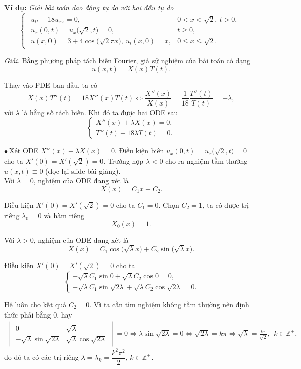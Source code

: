 \documentclass[10pt, a4paper]{article}
\begin{document}
	\textbf{Ví dụ:} \textit{Giải bài toán dao động tự do với hai đầu tự do} $$\begin{cases}
		\begin{array}{ll}
			u_{tt}-18u_{xx}=0, & 0<x<\sqrt2,~t>0,\\
			u_x(0,t)=u_x\big(\sqrt2,t\big)=0, & t\ge0,\\
			u(x,0)=3+4\cos\big(\sqrt 2\pi x\big),~u_t(x,0)=x, & 0\le x\le\sqrt2.
		\end{array}
	\end{cases}$$
	
	\textit{Giải.} Bằng phương pháp tách biến Fourier, giả sử nghiệm của bài toán có dạng $$u(x,t)=X(x)T(t).$$
	
	Thay vào PDE ban đầu, ta có $$X(x)T''(t)=18X''(x)T(t)\iff\frac{X''(x)}{X(x)}=\frac{1}{18}\frac{T''(t)}{T(t)}=-\lambda,$$
	với $\lambda$ là hằng số tách biến. Khi đó ta được hai ODE sau $$\begin{cases}
		X''(x)+\lambda X(x)=0,\\
		T''(t)+18\lambda T(t)=0.
	\end{cases}$$
	
	$\bullet~$Xét ODE $X''(x)+\lambda X(x)=0$. Điều kiện biên $u_x(0,t)=u_x\big(\sqrt2,t\big)=0$ cho ta $X'(0)=X'(\sqrt2)=0$. Trường hợp $\lambda<0$ cho ra nghiệm tầm thường $u(x,t)\equiv0$ (đọc lại slide bài giảng).\\
	
	Với $\lambda=0$, nghiệm của ODE đang xét là $$X(x)=C_1x+C_2.$$
	
	Điều kiện $X'(0)=X'(\sqrt2)=0$ cho ta $C_1=0$. Chọn $C_2=1$, ta có được trị riêng $\lambda_0=0$ và hàm riêng $$X_0(x)=1.$$
	
	Với $\lambda>0$, nghiệm của ODE đang xét là $$X(x)=C_1\cos\big(\sqrt\lambda x\big)+C_2\sin\big(\sqrt\lambda x\big).$$
	
	Điều kiện $X'(0)=X'(\sqrt2)=0$ cho ta $$\begin{cases}
		-\sqrt\lambda C_1\sin0+\sqrt\lambda C_2\cos0=0,\\
		-\sqrt\lambda C_1\sin\sqrt{2\lambda}+\sqrt\lambda C_2\cos\sqrt{2\lambda}=0.
	\end{cases}$$
	
	Hệ luôn cho kết quả $C_2=0$. Vì ta cần tìm nghiệm không tầm thường nên định thức phải bằng 0, hay \begin{align*}
		\begin{vmatrix}
			0&\sqrt\lambda\\
			-\sqrt\lambda\sin\sqrt{2\lambda}&\sqrt\lambda\cos\sqrt{2\lambda}
		\end{vmatrix}=0\iff\lambda\sin\sqrt{2\lambda}=0\iff\sqrt{2\lambda}=k\pi\iff\sqrt\lambda=\frac{k\pi}{\sqrt2},~~k\in\mathbb Z^+,
	\end{align*}
	do đó ta có các trị riêng $\lambda=\lambda_k=\dfrac{k^2\pi^2}{2},\,k\in\mathbb Z^+$.\\
	
\end{document}
